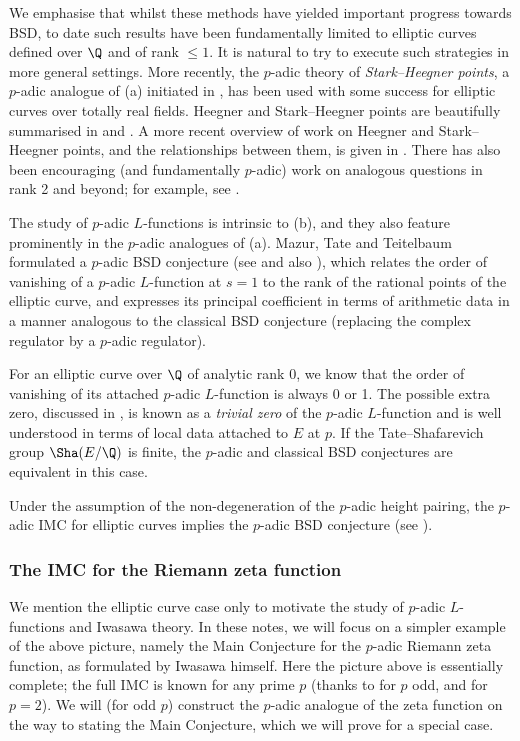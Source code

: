 \documentclass[a4paper,10pt, english, reqno]{smfart}
\numberwithin{equation}{section}
\begin{document}
We emphasise that whilst these methods have yielded important progress towards BSD, to date such results have been fundamentally limited to elliptic curves defined over $\Q$ and of rank $\leq 1$. It is natural to try to execute such strategies in more general settings. More recently, the $p$-adic theory of \emph{Stark--Heegner points}, a $p$-adic analogue of (a) initiated in \cite{Dar01}, has been used with some success for elliptic curves over totally real fields. Heegner and Stark--Heegner points are beautifully summarised in \cite{DarmonBook} and \cite{DarmonICM}. A more recent overview of work on Heegner and Stark--Heegner points, and the relationships between them, is given in \cite{DiagonalAsterisque}.  There has also been encouraging (and fundamentally $p$-adic) work on analogous questions in rank 2 and beyond; for example, see \cite{DR16,CastellaHsieh}.

\begin{remark}
The study of $p$-adic $L$-functions is intrinsic to (b), and they also feature prominently in the $p$-adic analogues of (a). Mazur, Tate and Teitelbaum formulated a $p$-adic  BSD conjecture (see \cite{MTT86} and also \cite{ColmezBSDpadique}), which relates the order of vanishing of a $p$-adic $L$-function at $s=1$ to the rank of the rational points of the elliptic curve, and expresses its principal coefficient in terms of arithmetic data in a manner analogous to the classical BSD conjecture (replacing the complex regulator by a $p$-adic regulator).
 
  For an elliptic curve over $\Q$ of analytic rank $0$, we know that the order of vanishing of its attached $p$-adic $L$-function is always 0 or 1. The possible extra zero, discussed in \cite{MTT86, GS93}, is known as a \textit{trivial zero} of the $p$-adic $L$-function and is well understood in terms of local data attached to $E$ at $p$. If the Tate--Shafarevich group $\Sha(E/\Q)$ is finite, the $p$-adic and classical BSD conjectures are equivalent in this case.
 
 Under the assumption of the non-degeneration of the $p$-adic height pairing, the $p$-adic IMC for elliptic curves implies the $p$-adic BSD conjecture (see \cite{Schneiderpadicheight}). 
\end{remark}



\subsubsection{The IMC for the Riemann zeta function}
We mention the elliptic curve case only to motivate the study of $p$-adic $L$-functions and Iwasawa theory. In these notes, we will focus on a simpler example of the above picture, namely the Main Conjecture for the $p$-adic Riemann zeta function, as formulated by Iwasawa himself. Here the picture above is essentially complete; the full IMC is known for any prime $p$ (thanks to \cite{MW84} for $p$ odd, and \cite{Wil90} for $p=2$). We will (for odd $p$) construct the $p$-adic analogue of the zeta function on the way to stating the Main Conjecture, which we will prove for a special case. 
\end{document}
